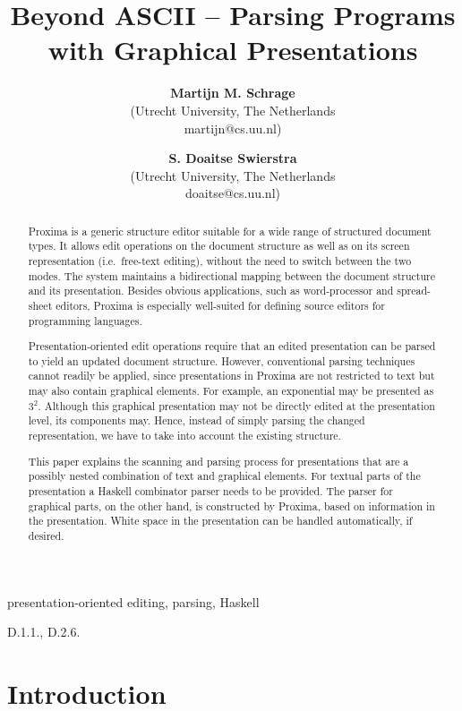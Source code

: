 \documentclass{article}[10pt]
\title{Beyond ASCII -- Parsing Programs with Graphical Presentations}
\author{{\bfseries Martijn M. Schrage}\\
   (Utrecht University, The Netherlands\\
   martijn@cs.uu.nl)
   \and
   {\bfseries S. Doaitse Swierstra}\\
   (Utrecht University, The Netherlands\\
   doaitse@cs.uu.nl)
}
\begin{document}
 

\maketitle

\begin{abstract}

Proxima is a generic structure editor suitable for a wide range of structured document types. It allows edit operations on the document structure as well as on its screen representation (i.e.\ free-text editing), without the need to switch between the two modes. The system maintains a bidirectional mapping between the document structure and its presentation. Besides obvious applications, such as word-processor and spread-sheet editors, Proxima is especially well-suited for defining source editors for programming languages.

Presentation-oriented edit operations require that an edited presentation can be parsed to yield an updated document structure. However, conventional parsing techniques cannot readily be applied, since presentations in Proxima are not restricted to text but may also contain graphical elements. For example, an exponential may be presented as $3^2$. Although this graphical presentation may not be directly edited at the presentation level, its components may. Hence, instead of simply parsing the changed representation, we have to take into account the existing structure. 

This paper explains the scanning and parsing process for presentations that are a possibly nested combination of text and graphical elements. For textual parts of the presentation a Haskell combinator parser needs to be provided. The parser for graphical parts, on the other hand, is constructed by Proxima, based on information in the presentation. White space in the presentation can be handled automatically, if desired. 
\end{abstract}

\begin{keywords}
presentation-oriented editing, parsing, Haskell
\end{keywords}

\begin{category}
D.1.1., D.2.6.
\end{category}

\section{Introduction}\label{sect:introduction}
\end{document}

